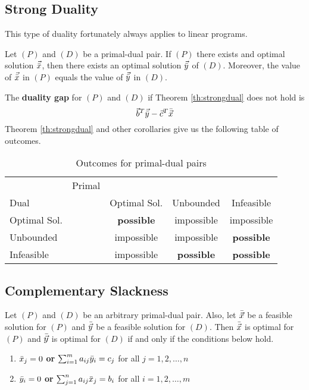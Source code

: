 \subsection{Strong Duality}
This type of duality fortunately always applies to linear programs.

\begin{theorem} \label{th:strongdual}
Let $(P)$ and $(D)$ be a primal-dual pair. If $(P)$ there exists and optimal solution $\Vec{\Bar{x}}$, then there exists an optimal solution $\Vec{\Bar{y}}$ of $(D)$. Moreover, the value of $\Vec{\Bar{x}}$ in $(P)$ equals the value of $\Vec{\Bar{y}}$ in $(D)$.
\end{theorem}

The \textbf{duality gap} for $(P)$ and $(D)$ if Theorem \ref{th:strongdual} does not hold is
\begin{equation}
    \Vec{b}^T\Vec{\Bar{y}} - \Vec{c}^T\Bar{\Vec{x}}
\end{equation}
Theorem \ref{th:strongdual} and other corollaries give us the following table of outcomes.

\begin{table}[h]
    \centering
    \begin{tabular}{lr|ccc}
                     & Primal & & & \\
        Dual         &        & Optimal Sol. & Unbounded & Infeasible \\
        \hline
        Optimal Sol. &        & \textbf{possible} & impossible          & impossible \\
        Unbounded    &        & impossible        & impossible          & \textbf{possible} \\
        Infeasible   &        & impossible        & \textbf{possible}   & \textbf{possible}
    \end{tabular}
    \caption{Outcomes for primal-dual pairs}
    \label{tab:dualoutcomes}
\end{table}


\subsection{Complementary Slackness}
\begin{theorem}
Let $(P)$ and $(D)$ be an arbitrary primal-dual pair. Also, let $\Bar{\Vec{x}}$ be a feasible solution for $(P)$ and $\Bar{\Vec{y}}$ be a feasible solution for $(D)$. Then $\Bar{\Vec{x}}$ is optimal for $(P)$ and $\Bar{\Vec{y}}$ is optimal for $(D)$ if and only if the conditions below hold.
\begin{enumerate}
    \item $\Bar{x}_j=0$  \textbf{or}  $\sum_{i=1}^m a_{ij}\Bar{y}_i=c_j$  for all $j=1,2,\dots,n$
    \item $\Bar{y}_i=0$  \textbf{or}  $\sum_{j=1}^n a_{ij}\Bar{x}_j=b_i$  for all $i=1,2,\dots,m$
\end{enumerate}
\end{theorem}



